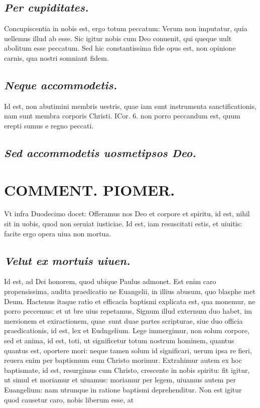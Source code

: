 \documentclass{article}
\begin{document}
\begin{pages}
\subsection*{\textit{Per cupiditates. }}\pstart Concupiscentia in nobis est, ergo totum peccatum: Verum non imputatur, quia uellemus illud ab esse. Sic igitur nobis cum Deo conuenit, qui queque  uult abolitum esse peccatum. Sed hic constantissima fide opus est, non opinione carnis, qua nostri somniant fidem.   \pend
{}
{}
\subsection*{\textit{Neque accommodetis. }}\pstart Id est, non abutimini membris uestris, quae iam sunt instrumenta sanctificationis, nam sunt membra corporis Christi. ICor. 6. non porro peccandum est, quum erepti sumus e regno peccati.   \pend
{}
{}
\subsection*{\textit{Sed accommodetis uosmetipsos Deo. }}
\section*{COMMENT. PIOMER.  }\pstart Vt infra Duodecimo docet: Offeramus nos Deo et corpore et spiritu, id est, nihil sit in uobis, quod non seruiat iusticiae.   \pend\pstart Id est, iam resuscitati estis, et uiuitis: facite ergo opera uiua non mortua.   \pend
{}
{}
\subsection*{\textit{Velut ex mortuis uiuen. }}\pstart Id est, ad Dei honorem, quod ubique Paulus admonet. Est enim caro propensissima, audita praedicatio ne Euangelii, in illius abusum, quo blasphe met Deum.  Hactenus itaque ratio et efficacia baptismi explicata est, qua monemur, ne porro peccemus: et ut bre uius repetamus, Signum illud externum duo habet, im mersionem et exiractionem, quae sunt duae partes scripturae, siue duo officia praedicationis, id est, lex et Eudngelium. Lege immergimur, non solum corpore, sed et anima, id est, toti, ut significetur totum nostrum hominem, quantus quantus est, oportere mori: neque tamen solum id significari, uerum ipsa re fieri, reuera enim per baptismum eum Christo morimur. Extrahimur autem ex hoc baptismate, id est, resurgimus cum Christo, crescente in nobis spiritu: fit igitur, ut simul et moriamur et uiuamus: moriamur per legem, uiuamus autem per Euangelium: nam utrunque in ratione baptismi deprehenditur. Non est igitur quod causetur caro, nobis liberum esse, at  \pend
{}
{}

\end{pages}
\end{document}
